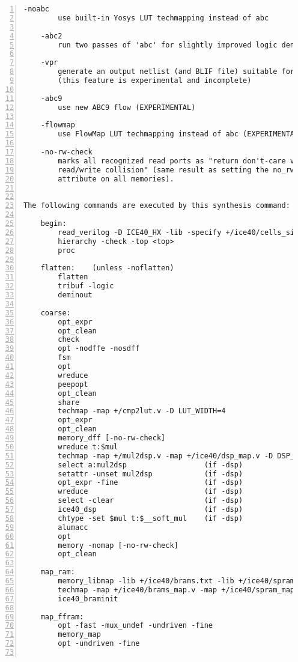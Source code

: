 \begin{lstlisting}[numbers=left,frame=single]
    -noabc
        use built-in Yosys LUT techmapping instead of abc

    -abc2
        run two passes of 'abc' for slightly improved logic density

    -vpr
        generate an output netlist (and BLIF file) suitable for VPR
        (this feature is experimental and incomplete)

    -abc9
        use new ABC9 flow (EXPERIMENTAL)

    -flowmap
        use FlowMap LUT techmapping instead of abc (EXPERIMENTAL)

    -no-rw-check
        marks all recognized read ports as "return don't-care value on
        read/write collision" (same result as setting the no_rw_check
        attribute on all memories).


The following commands are executed by this synthesis command:

    begin:
        read_verilog -D ICE40_HX -lib -specify +/ice40/cells_sim.v
        hierarchy -check -top <top>
        proc

    flatten:    (unless -noflatten)
        flatten
        tribuf -logic
        deminout

    coarse:
        opt_expr
        opt_clean
        check
        opt -nodffe -nosdff
        fsm
        opt
        wreduce
        peepopt
        opt_clean
        share
        techmap -map +/cmp2lut.v -D LUT_WIDTH=4
        opt_expr
        opt_clean
        memory_dff [-no-rw-check]
        wreduce t:$mul
        techmap -map +/mul2dsp.v -map +/ice40/dsp_map.v -D DSP_A_MAXWIDTH=16 -D DSP_B_MAXWIDTH=16 -D DSP_A_MINWIDTH=2 -D DSP_B_MINWIDTH=2 -D DSP_Y_MINWIDTH=11 -D DSP_NAME=$__MUL16X16    (if -dsp)
        select a:mul2dsp                  (if -dsp)
        setattr -unset mul2dsp            (if -dsp)
        opt_expr -fine                    (if -dsp)
        wreduce                           (if -dsp)
        select -clear                     (if -dsp)
        ice40_dsp                         (if -dsp)
        chtype -set $mul t:$__soft_mul    (if -dsp)
        alumacc
        opt
        memory -nomap [-no-rw-check]
        opt_clean

    map_ram:
        memory_libmap -lib +/ice40/brams.txt -lib +/ice40/spram.txt -no-auto-huge [-no-auto-huge] [-no-auto-block]    (-no-auto-huge unless -spram, -no-auto-block if -nobram)
        techmap -map +/ice40/brams_map.v -map +/ice40/spram_map.v
        ice40_braminit

    map_ffram:
        opt -fast -mux_undef -undriven -fine
        memory_map
        opt -undriven -fine


\end{lstlisting}
